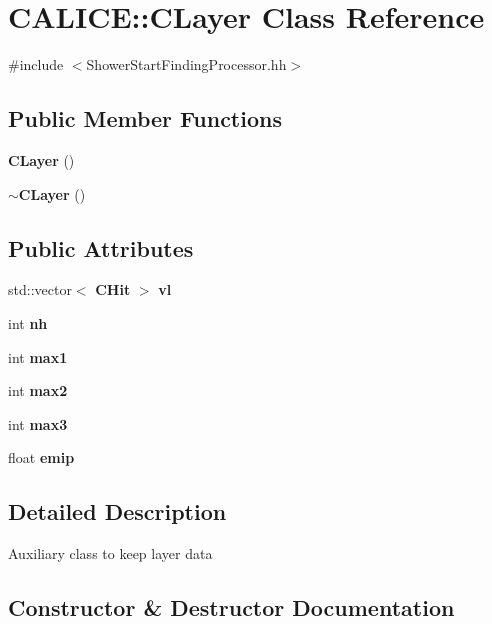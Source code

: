 \section{C\-A\-L\-I\-C\-E\-:\-:C\-Layer Class Reference}
\label{classCALICE_1_1CLayer}


{\ttfamily \#include $<$Shower\-Start\-Finding\-Processor.\-hh$>$}

\subsection*{Public Member Functions}
\begin{DoxyCompactItemize}
\item 
{\bf C\-Layer} ()
\item 
{\bf $\sim$\-C\-Layer} ()
\end{DoxyCompactItemize}
\subsection*{Public Attributes}
\begin{DoxyCompactItemize}
\item 
std\-::vector$<$ {\bf C\-Hit} $>$ {\bfseries vl}\label{classCALICE_1_1CLayer_a1f81b6426a1fd05d9ee9c08caf280105}

\item 
int {\bfseries nh}\label{classCALICE_1_1CLayer_a5ebf93c7468c15249c7d9ff37cc5c4fc}

\item 
int {\bfseries max1}\label{classCALICE_1_1CLayer_a3914d8312e88ba70a161c3814cfeb906}

\item 
int {\bfseries max2}\label{classCALICE_1_1CLayer_aed809eafdd95d60d31b290ce6b43b574}

\item 
int {\bfseries max3}\label{classCALICE_1_1CLayer_a1ac008439a68abd6b30193a504cff3eb}

\item 
float {\bf emip}
\end{DoxyCompactItemize}


\subsection{Detailed Description}
Auxiliary class to keep layer data 

\subsection{Constructor \& Destructor Documentation}
